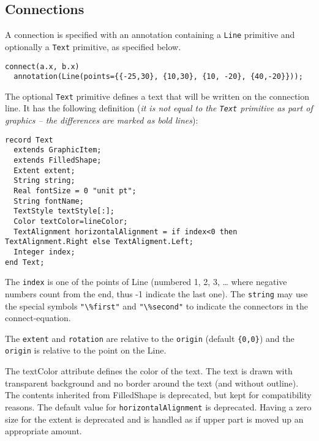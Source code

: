 \subsection{Connections}\label{connections1}

A connection is specified with an annotation containing a \lstinline!Line! primitive and optionally a \lstinline!Text! primitive, as specified below.

\begin{example}
\begin{lstlisting}[language=modelica]
connect(a.x, b.x)
  annotation(Line(points={{-25,30}, {10,30}, {10, -20}, {40,-20}}));
\end{lstlisting}
\end{example}

The optional \lstinline!Text! primitive defines a text that will be written on the connection line.  It has the following definition (\emph{it is not equal to the \lstinline!Text! primitive as part of graphics -- the differences are marked as bold lines}):
\begin{lstlisting}[language=modelica]
record Text
  extends GraphicItem;
  extends FilledShape;
  Extent extent;
  String string;
  Real fontSize = 0 "unit pt";
  String fontName;
  TextStyle textStyle[:];
  Color textColor=lineColor;
  TextAlignment horizontalAlignment = if index<0 then TextAlignment.Right else TextAligment.Left;
  Integer index;
end Text;
\end{lstlisting}

The \lstinline!index! is one of the points of Line (numbered 1, 2, 3, \ldots{} where
negative numbers count from the end, thus -1 indicate the last one). The \lstinline!string!
may use the special
symbols \lstinline!"\%first"! and \lstinline!"\%second"! to indicate the connectors in the
connect-equation.

The \lstinline!extent! and \lstinline!rotation! are relative to the \lstinline!origin! (default \lstinline!{0,0}!)
and the \lstinline!origin! is relative to the point on the Line.

The textColor attribute defines the color of the text. The text is drawn
with transparent background and no border around the text (and without
outline). The contents inherited from FilledShape is deprecated, but kept for compatibility reasons.
The default value for \lstinline!horizontalAlignment! is deprecated.
Having a zero size for the extent is deprecated and is handled as if upper part is moved up an appropriate amount.

